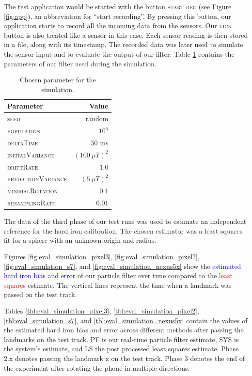 The test application would be started with the button \textsc{start rec} (see Figure \ref{fig:app}), an abbreviation for ``start recording''. By pressing this button, our application starts to record all the incoming data from the sensors. Our \textsc{tick} button is also treated like a sensor in this case. Each sensor reading is then stored in a file, along with its timestamp. The recorded data was later used to simulate the sensor input and to evaluate the output of our filter. Table \ref{tbl:eval_params} contains the parameters of our filter used during the simulation.

\begin{table}[H]
    \centering
    \begin{tabular}{ | l | r | }
    \hline
    \textbf{Parameter}              & \textbf{Value} \\ \hline
    \textsc{seed}                   & random \\ \hline
    \textsc{population}             & $10^5$ \\ \hline
    \textsc{deltaTime}              & 50 ms \\ \hline
    \textsc{initialVariance}        & $(100\ \mu T)^2$ \\ \hline
    \textsc{driftRate}              & $1.0$ \\ \hline
    \textsc{predictionVariance}     & $(5\ \mu T)^2$ \\ \hline
    \textsc{minimalRotation}        & $0.1$ \\ \hline
    \textsc{resamplingRate}         & $0.01$ \\ \hline
    \end{tabular}
    \caption{Chosen parameter for the simulation.}
    \label{tbl:eval_params}
\end{table}

The data of the third phase of our test runs was used to estimate an independent reference for the hard iron calibration. The chosen estimator was a least squares fit for a sphere with an unknown origin and radius.\cite{Jekel2016} 

Figures \ref{fig:eval_simulation_pixel3}, \ref{fig:eval_simulation_pixel2}, \ref{fig:eval_simulation_s7}, and \ref{fig:eval_simulation_nexus5x} show the \textcolor{blue}{estimated hard iron bias and error} of our particle filter over time compared to the \textcolor{red}{least squares} estimate. The vertical lines represent the time when a landmark was passed on the test track.

Tables \ref{tbl:eval_simulation_pixel3}, \ref{tbl:eval_simulation_pixel2}, \ref{tbl:eval_simulation_s7}, and \ref{tbl:eval_simulation_nexus5x} contain the values of the estimated hard iron bias and error across different methods after passing the landmarks on the test track. \textsc{PF} is our real-time particle filter estimate, \textsc{SYS} is the system's estimate, and \textsc{LS} the post processed least squares estimate. Phase 2.x denotes passing the landmark x on the test track. Phase 3 denotes the end of the experiment after rotating the phone in multiple directions.

